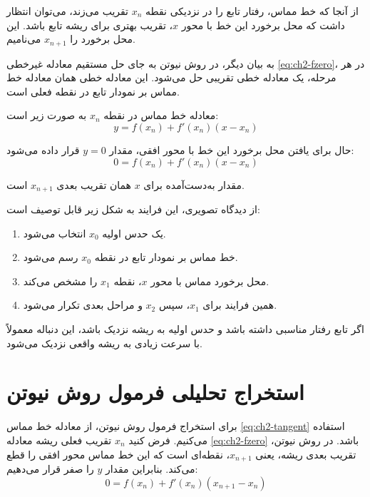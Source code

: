 از آنجا که خط مماس، رفتار تابع را در نزدیکی نقطه $x_n$ تقریب می‌زند، می‌توان انتظار داشت که محل برخورد این خط با محور $x$، تقریب بهتری برای ریشه تابع باشد. این محل برخورد را $x_{n+1}$ می‌نامیم.

به بیان دیگر، در روش نیوتن به جای حل مستقیم معادله غیرخطی \eqref{eq:ch2-fzero}، در هر مرحله، یک معادله خطی تقریبی حل می‌شود. این معادله خطی همان معادله خط مماس بر نمودار تابع در نقطه فعلی است.

معادله خط مماس در نقطه $x_n$ به صورت زیر است:
\begin{equation}
y=f(x_n)+f'(x_n)(x-x_n)
\label{eq:ch2-tangent}
\end{equation}

حال برای یافتن محل برخورد این خط با محور افقی، مقدار $y=0$ قرار داده می‌شود:
\begin{equation}
0=f(x_n)+f'(x_n)(x-x_n)
\label{eq:ch2-tangent-zero}
\end{equation}

مقدار به‌دست‌آمده برای $x$ همان تقریب بعدی $x_{n+1}$ است.

از دیدگاه تصویری، این فرایند به شکل زیر قابل توصیف است:
\begin{enumerate}
    \item یک حدس اولیه $x_0$ انتخاب می‌شود.
    \item خط مماس بر نمودار تابع در نقطه $x_0$ رسم می‌شود.
    \item محل برخورد مماس با محور $x$، نقطه $x_1$ را مشخص می‌کند.
    \item همین فرایند برای $x_1$، سپس $x_2$ و مراحل بعدی تکرار می‌شود.
\end{enumerate}

اگر تابع رفتار مناسبی داشته باشد و حدس اولیه به ریشه نزدیک باشد، این دنباله معمولاً با سرعت زیادی به ریشه واقعی نزدیک می‌شود.

\section{استخراج تحلیلی فرمول روش نیوتن}
\label{sec:formula}

برای استخراج فرمول روش نیوتن، از معادله خط مماس \eqref{eq:ch2-tangent} استفاده می‌کنیم. فرض کنید $x_n$ تقریب فعلی ریشه معادله \eqref{eq:ch2-fzero} باشد. در روش نیوتن، تقریب بعدی ریشه، یعنی $x_{n+1}$، نقطه‌ای است که این خط مماس محور افقی را قطع می‌کند. بنابراین مقدار $y$ را صفر قرار می‌دهیم:
\begin{equation}
0=f(x_n)+f'(x_n)(x_{n+1}-x_n)
\label{eq:ch2-newton-deriv1}
\end{equation}

